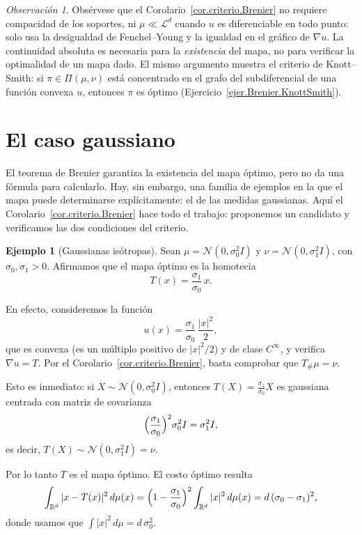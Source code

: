 \documentclass[12pt, a4paper]{amsbook}
\newcommand{\R}{{\mathbb R}}
\theoremstyle{remark}
\newtheorem{obs}[teo]{Observación}
\theoremstyle{definition}
\newtheorem{ejem}[teo]{Ejemplo}
\numberwithin{section}{chapter}
\numberwithin{subsection}{section}
\numberwithin{equation}{section}
\numberwithin{figure}{chapter}
\begin{document}
\begin{obs}
Obsérvese que el Corolario~\ref{cor.criterio.Brenier} no requiere
compacidad de los soportes, ni $\mu\ll\mathcal L^d$ cuando $u$ es
diferenciable en todo punto: solo usa la desigualdad de Fenchel--Young y la
igualdad en el gráfico de $\nabla u$. La continuidad absoluta es
necesaria para la \emph{existencia} del mapa, no para verificar la optimalidad
de un mapa dado. El mismo argumento muestra el criterio de Knott--Smith: si
$\pi\in\Pi(\mu,\nu)$ está concentrado en el grafo del subdiferencial de una
función convexa $u$, entonces $\pi$ es óptimo
(Ejercicio~\ref{ejer.Brenier.KnottSmith}).
\end{obs}

\section{El caso gaussiano}\label{sec.gaussiano}

El teorema de Brenier garantiza la existencia del mapa óptimo, pero no da una
fórmula para calcularlo. Hay, sin embargo, una familia de ejemplos en la que el
mapa puede determinarse explícitamente: el de las medidas gaussianas. Aquí el
Corolario~\ref{cor.criterio.Brenier} hace todo el trabajo: proponemos un
candidato y verificamos las dos condiciones del criterio.

\begin{ejem}[Gaussianas isótropas]\label{ej.gaussianas.isotropas}
Sean $\mu=\mathcal N(0,\sigma_0^2I)$ y $\nu=\mathcal N(0,\sigma_1^2I)$, con
$\sigma_0,\sigma_1>0$. Afirmamos que el mapa óptimo es la homotecia
\[
T(x)=\frac{\sigma_1}{\sigma_0}\,x.
\]

En efecto, consideremos la función
\[
u(x)=\frac{\sigma_1}{\sigma_0}\,\frac{|x|^2}{2},
\]
que es convexa (es un múltiplo positivo de $|x|^2/2$) y de clase $C^\infty$, y
verifica $\nabla u=T$. Por el Corolario~\ref{cor.criterio.Brenier}, basta
comprobar que $T_\#\mu=\nu$.

Esto es inmediato: si $X\sim\mathcal N(0,\sigma_0^2I)$, entonces
$T(X)=\tfrac{\sigma_1}{\sigma_0}X$ es gaussiana centrada con matriz de
covarianza
\[
\Bigl(\frac{\sigma_1}{\sigma_0}\Bigr)^2\sigma_0^2I=\sigma_1^2I,
\]
es decir, $T(X)\sim\mathcal N(0,\sigma_1^2I)=\nu$.

Por lo tanto $T$ es el mapa óptimo. El costo óptimo resulta
\[
\int_{\R^d}|x-T(x)|^2\,d\mu(x)
=
\Bigl(1-\frac{\sigma_1}{\sigma_0}\Bigr)^2\int_{\R^d}|x|^2\,d\mu(x)
=
d\,(\sigma_0-\sigma_1)^2,
\]
donde usamos que $\int|x|^2\,d\mu=d\,\sigma_0^2$.
\end{ejem}
\end{document}
